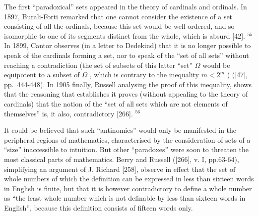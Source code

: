 The first ``paradoxical'' sets appeared in the theory of cardinals and ordinals. In 1897, Burali-Forti remarked that one cannot consider the existence of a set consisting of all the ordinals, because this set would be well ordered, and so isomorphic to one of its segments distinct from the whole, which is absurd {[}42{]}. \(^{55}\) In 1899, Cantor observes (in a letter to Dedekind) that it is no longer possible to speak of the cardinals forming a set, nor to speak of the ``set of all sets'' without reaching a contradiction (the set of subsets of this latter ``set'' \(\Omega\) would be equipotent to a subset of \(\Omega\) , which is contrary to the inequality \(m < 2^{m}\) ) ({[}47{]}, pp.~444-448). In 1905 finally, Russell analysing the proof of this inequality, shows that the reasoning that establishes it proves (without appealing to the theory of cardinals) that the notion of the ``set of all sets which are not elements of themselves'' is, it also, contradictory {[}266{]}. \(^{56}\)

It could be believed that such ``antinomies'' would only be manifested in the peripheral regions of mathematics, characterised by the consideration of sets of a ``size'' inaccessible to intuition. But other ``paradoxes'' were soon to threaten the most classical parts of mathematics. Berry and Russell ({[}266{]}, v. I, pp.63-64), simplifying an argument of J. Richard {[}258{]}, observe in effect that the set of whole numbers of which the definition can be expressed in less than sixteen words in English is finite, but that it is however contradictory to define a whole number as ``the least whole number which is not definable by less than sixteen words in English'', because this definition consists of fifteen words only.

